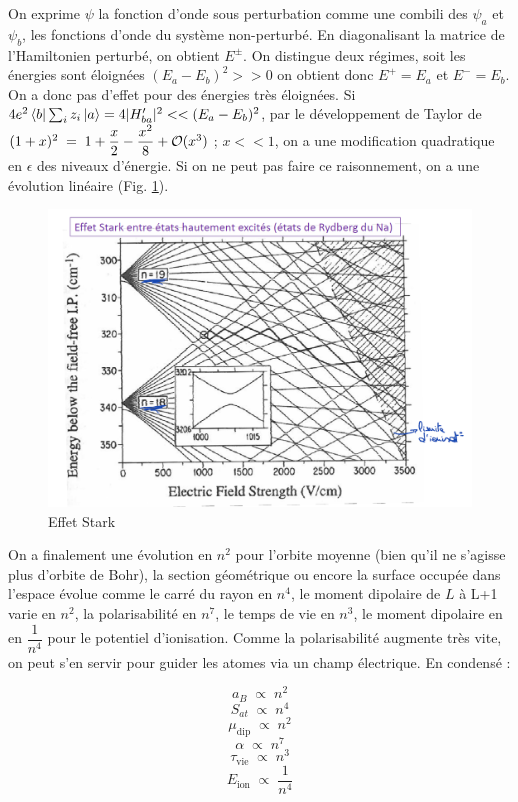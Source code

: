 On exprime $\psi$ la fonction d'onde sous perturbation comme une combili des $\psi_a$ et $\psi_b$, les fonctions d'onde du système non-perturbé. En diagonalisant la matrice de l'Hamiltonien perturbé, on obtient $E^{\pm}$. On distingue deux régimes, soit les énergies sont éloignées $(E_a - E_b)^2 >> 0$ on obtient donc $E^+ = E_a$ et $E^- = E_b$. On a donc pas d'effet pour des énergies très éloignées. Si $4e^2\bra{b}\sum_iz_i\ket{a} = 4|H'_{ba}|^2<<(E_a - E_b)^2 $, par le développement de Taylor de $(1 + x)^2\; = \; 1 + \dfrac{x}{2} - \dfrac{x^2}{8} + \mathcal{O}(x^3)$ ; $x<<1$, on a une modification quadratique en $\epsilon$ des niveaux d'énergie. Si on ne peut pas faire ce raisonnement, on a une évolution linéaire (Fig. \ref{fig:stark_lin}).

\begin{figure}[htp]
    \centering
    \includegraphics[scale=0.7]{Images2/GrapheStark.PNG}
    \caption{Effet Stark}
    \label{fig:stark_lin}
\end{figure}

On a finalement une évolution en $n^2$ pour l'orbite moyenne (bien qu'il ne s'agisse plus d'orbite de Bohr), la section géométrique ou encore la surface occupée dans l'espace évolue comme le carré du rayon en $n^4$, le moment dipolaire de $L$ à L+1 varie en $n^2$, la polarisabilité en $n^7$, le temps de vie en $n^3$, le moment dipolaire en en $\dfrac{1}{n^4}$ pour le potentiel d'ionisation. Comme la polarisabilité augmente très vite, on peut s'en servir pour guider les atomes via un champ électrique. En condensé :

\[
    a_B \; \propto\; n^2
\]
\[
    S_{at} \; \propto\; n^4
\]
\[
    \mu_\text{dip} \; \propto\; n^2
\]
\[
    \alpha \; \propto\; n^7
\]
\[
    \tau_\text{vie} \; \propto\; n^3
\]
\[
    E_\text{ion} \; \propto\; \dfrac{1}{n^4}
\]

